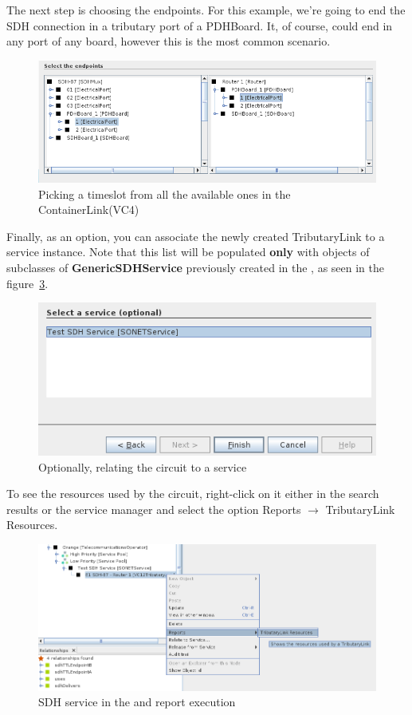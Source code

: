 \documentclass[a4paper]{article}
\begin{document}
		The next step is choosing the endpoints. For this example, we're going to end the SDH connection in a tributary port of a PDHBoard. It, of course, could end in any port of any board, however this is the most common scenario.
		\begin{figure}[h!]
			\centering
			\includegraphics[width=\linewidth]{img/sdh_module_tributary_link_step_4.png}
			\caption{Picking a timeslot from all the available ones in the ContainerLink(VC4)}
			\label{fig:sdh_module_tributary_link_step_4}
		\end{figure}
		\newpage
		Finally, as an option, you can associate the newly created TributaryLink to a service instance. Note that this list will be populated \textbf{only} with objects of subclasses of \textbf{GenericSDHService} previously created in the , as seen in the figure~\ref{fig:sdh_module_tributary_link_service_report}.
		\begin{figure}[h!]
			\centering
			\includegraphics[width=0.7\linewidth]{img/sdh_module_tributary_link_step_5.png}
			\caption{Optionally, relating the circuit to a service}
			\label{fig:sdh_module_tributary_link_step_5}
		\end{figure}
		
		To see the resources used by the circuit, right-click on it either in the search results or the service manager and select the option Reports $\rightarrow$ TributaryLink Resources.
		\begin{figure}[h!]
			\centering
			\includegraphics[width=\linewidth]{img/sdh_module_tributary_link_service_report.png}
			\caption{SDH service in the  and report execution}
			\label{fig:sdh_module_tributary_link_service_report}
		\end{figure}
		
\end{document}
